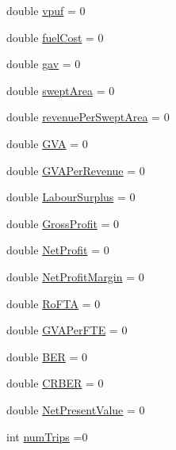 \begin{DoxyCompactItemize}
double \mbox{\hyperlink{struct_vessels_loglike_table_1_1_log_a2c098dbfdf974fd4bc1a7453d7976ecd}{vpuf}} = 0
\item 
double \mbox{\hyperlink{struct_vessels_loglike_table_1_1_log_a0bfdfa9187258a0545c0b85c52452987}{fuel\+Cost}} = 0
\item 
double \mbox{\hyperlink{struct_vessels_loglike_table_1_1_log_afb108e6284a73383bf887d665d5dd44f}{gav}} = 0
\item 
double \mbox{\hyperlink{struct_vessels_loglike_table_1_1_log_a4edfcf376216998c398acc740eaa9a08}{swept\+Area}} = 0
\item 
double \mbox{\hyperlink{struct_vessels_loglike_table_1_1_log_a758aa0552c5df59f74fa169c4b96e049}{revenue\+Per\+Swept\+Area}} = 0
\item 
double \mbox{\hyperlink{struct_vessels_loglike_table_1_1_log_a639205dfda6f0fb70a0ddc1e531e96ee}{G\+VA}} = 0
\item 
double \mbox{\hyperlink{struct_vessels_loglike_table_1_1_log_a8cd54fa9db040e660e1c3c0b8e0177c5}{G\+V\+A\+Per\+Revenue}} = 0
\item 
double \mbox{\hyperlink{struct_vessels_loglike_table_1_1_log_a89e91d9d4cf410dd5f54b35d1508de08}{Labour\+Surplus}} = 0
\item 
double \mbox{\hyperlink{struct_vessels_loglike_table_1_1_log_a9e538bc0d25db882df5ff25f45707adf}{Gross\+Profit}} = 0
\item 
double \mbox{\hyperlink{struct_vessels_loglike_table_1_1_log_a6a0ba0d6448ca17be3e3c591eeea3577}{Net\+Profit}} = 0
\item 
double \mbox{\hyperlink{struct_vessels_loglike_table_1_1_log_a447278c738cf041c9c5ab5a21d64917b}{Net\+Profit\+Margin}} = 0
\item 
double \mbox{\hyperlink{struct_vessels_loglike_table_1_1_log_a41d33af671100013c0594672fff2f096}{Ro\+F\+TA}} = 0
\item 
double \mbox{\hyperlink{struct_vessels_loglike_table_1_1_log_ab65dad22faecabbba3f3d8b97dd5e1ac}{G\+V\+A\+Per\+F\+TE}} = 0
\item 
double \mbox{\hyperlink{struct_vessels_loglike_table_1_1_log_a8bc9fc4940c4789fce0126cf85227d95}{B\+ER}} = 0
\item 
double \mbox{\hyperlink{struct_vessels_loglike_table_1_1_log_a320857bf1ab6fb4ac0eccf52bbed0726}{C\+R\+B\+ER}} = 0
\item 
double \mbox{\hyperlink{struct_vessels_loglike_table_1_1_log_abcbae9e37634cccf6acf1b479d9a518e}{Net\+Present\+Value}} = 0
\item 
int \mbox{\hyperlink{struct_vessels_loglike_table_1_1_log_a0df4266b9719c683c7b5615a3bb3119c}{num\+Trips}} =0
\end{DoxyCompactItemize}


